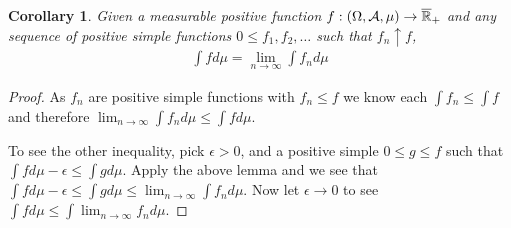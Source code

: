 \documentclass{amsart}
\newtheorem{cor}[thm]{Corollary}
\theoremstyle{remark}
\theoremstyle{definition}
\begin{document}
\begin{cor}Given a measurable positive function $f : (\Omega, \mathcal{A},
  \mu) \to \overline{\mathbb{R}}_+$ and any sequence of positive simple functions $0 \leq f_1,
  f_2, \dots$ such that $f_n \uparrow f$, 
\begin{align*}
\int f d \mu = \lim_{n \to \infty} \int f_n d\mu
\end{align*}
\end{cor}
\begin{proof}As $f_n$ are positive simple functions with $f_n \leq f$
  we know each $\int f_n \leq \int f$ and therefore $\lim_{n \to \infty} \int f_n
  d\mu \leq \int f d \mu$.  

To see the other inequality, pick $\epsilon > 0$, and a positive
simple $0 \leq g \leq f$ such that $\int f d \mu - \epsilon \leq \int
g d \mu$.  Apply the above lemma and we see that $\int f d \mu - \epsilon \leq \int
g d \mu \leq \lim_{n \to \infty} \int f_n d \mu$.  Now let $\epsilon \to 0$ to see $\int f d \mu
\leq \int \lim_{n \to \infty} f_n d \mu$.
\end{proof}
\end{document}

